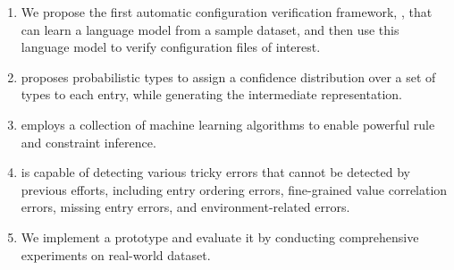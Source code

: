\begin{enumerate}

\item We propose the first automatic configuration verification
framework, \app, that can learn a language model from a sample
dataset, and then use this language model to verify 
configuration files of interest.
 
\item \app proposes probabilistic types to assign a confidence 
distribution over a set of types to each entry, 
while generating the intermediate representation. 

\item \app employs a collection of machine learning algorithms to 
enable powerful rule and constraint inference.

\item \app is capable of detecting various tricky errors that cannot
be detected by previous efforts,
including entry ordering errors, fine-grained value correlation errors, 
missing entry errors, and environment-related errors. 

\item We implement a \app prototype and evaluate it by
conducting comprehensive experiments on real-world dataset.

\end{enumerate}
